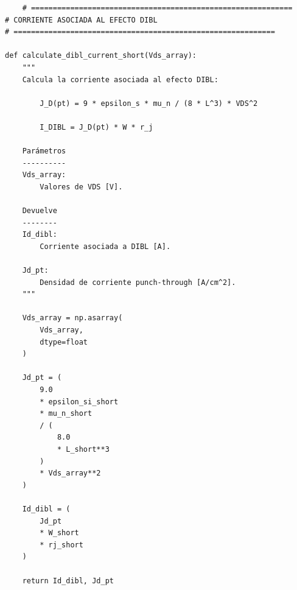 \documentclass[a4paper, twoside, 10pt, spanish]{article}
\numberwithin{table}{section}
\begin{document}
\begin{verbatim}
    # ============================================================
# CORRIENTE ASOCIADA AL EFECTO DIBL
# ============================================================

def calculate_dibl_current_short(Vds_array):
    """
    Calcula la corriente asociada al efecto DIBL:

        J_D(pt) = 9 * epsilon_s * mu_n / (8 * L^3) * VDS^2

        I_DIBL = J_D(pt) * W * r_j

    Parámetros
    ----------
    Vds_array:
        Valores de VDS [V].

    Devuelve
    --------
    Id_dibl:
        Corriente asociada a DIBL [A].

    Jd_pt:
        Densidad de corriente punch-through [A/cm^2].
    """

    Vds_array = np.asarray(
        Vds_array,
        dtype=float
    )

    Jd_pt = (
        9.0
        * epsilon_si_short
        * mu_n_short
        / (
            8.0
            * L_short**3
        )
        * Vds_array**2
    )

    Id_dibl = (
        Jd_pt
        * W_short
        * rj_short
    )

    return Id_dibl, Jd_pt
\end{verbatim}
\end{document}
